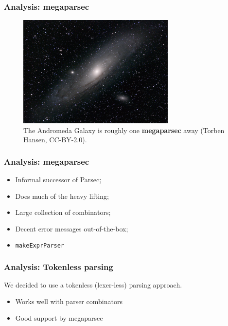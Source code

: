 \documentclass{beamer}
\begin{document}
\begin{frame}
  \frametitle{Analysis: megaparsec}

  \begin{figure}
    \begin{center}
      \includegraphics[width=0.7\textwidth]{figures/andromeda.jpg}
      \captionsetup{labelformat=empty}
      \caption{The Andromeda Galaxy is roughly one \textbf{megaparsec} away (Torben Hansen, CC-BY-2.0).}
    \end{center}
  \end{figure}
\end{frame}

\begin{frame}
  \frametitle{Analysis: megaparsec}

  \begin{itemize}
    \item Informal successor of Parsec;
    \item Does much of the heavy lifting;
    \item Large collection of combinators;
    \item Decent error messages out-of-the-box;
    \item \texttt{makeExprParser} 
  \end{itemize}
\end{frame}

\begin{frame}
  \frametitle{Analysis: Tokenless parsing}

  We decided to use a tokenless (lexer-less) parsing approach.

  \begin{itemize}
    \item Works well with parser combinators
    \item Good support by megaparsec
  \end{itemize}
\end{frame}
\end{document}
